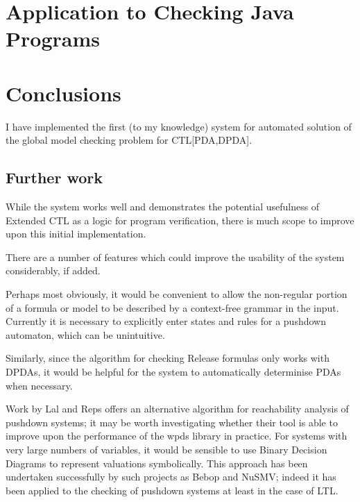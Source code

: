 \documentclass[11pt]{article}
\theoremstyle{definition}
\begin{document}
{\section{Application to Checking Java Programs}

\cite{hague2010analysing}

\section{Conclusions}

I have implemented the first (to my knowledge) system for automated solution of
the global model checking problem for CTL[PDA,DPDA].





\subsection{Further work}

While the system works well and demonstrates the potential usefulness of
Extended CTL as a logic for program verification, there is much scope to
improve upon this initial implementation. 

There are a number of features which could improve the usability of the system
considerably, if added.

Perhaps most obviously, it would be convenient to allow the non-regular portion
of a formula or model to be described by a context-free grammar in the input.
Currently it is necessary to explicitly enter states and rules for a pushdown
automaton, which can be unintuitive. 

Similarly, since the algorithm for checking Release formulas only works with
DPDAs, it would be helpful for the system to automatically determinise PDAs
when necessary.



Work by Lal and Reps\cite{lal2006improving} offers an alternative algorithm for
reachability analysis of pushdown systems; it may be worth investigating
whether their tool is able to improve upon the performance of the wpds library
in practice.
For systems with very large numbers of variables, it would be sensible to use
Binary Decision Diagrams to represent valuations symbolically. 
This approach has been undertaken successfully by such projects as
Bebop\cite{ball2000bebop} and NuSMV\cite{cimatti2002nusmv}; indeed it has been
applied to the checking of pushdown systems at least in the case of
LTL\cite{esparza2001bdd}.

}
\end{document}
